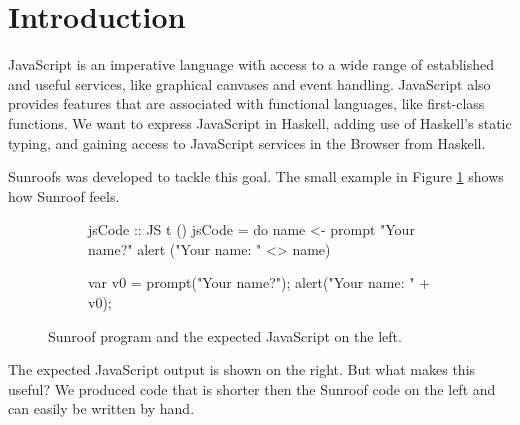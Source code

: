  
\section{Introduction}

JavaScript is an imperative language with access to a wide range
of established and useful services, like graphical canvases and event
handling. JavaScript also provides features that are associated with 
functional languages, like first-class functions. 
We want to express JavaScript in Haskell, adding use
of Haskell's static typing, and gaining access to JavaScript services
in the Browser from Haskell.

Sunroofs was developed to tackle this goal.
The small example in Figure \ref{fig:code-example} 
shows how Sunroof feels.
\begin{figure}[h]
\vspace{-0.5cm}
\centering
\begin{subfigure}{0.45\textwidth}%
\begin{Code}
 jsCode :: JS t ()
 jsCode = do
   name <- prompt "Your name?"
   alert ("Your name: " <> name)
\end{Code}%
\end{subfigure}%
\hfill%
\begin{subfigure}{0.45\textwidth}
\vspace{0.25cm}%
\begin{Code}
  
  
var v0 = prompt("Your name?"); 
alert("Your name: " + v0);
\end{Code}%
\end{subfigure}%
\caption{Sunroof program and the expected JavaScript on the left.}%
\label{fig:code-example}%
\vspace{-0.5cm}
\end{figure}
The expected JavaScript output is shown on the right. But what makes 
this useful? We produced code that is shorter 
then the Sunroof code on the left and can easily be written by hand.

